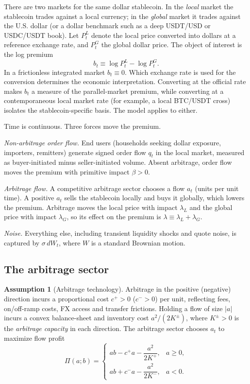 \documentclass[12pt]{article}
\theoremstyle{definition}
\newtheorem{assumption}{Assumption}
\theoremstyle{remark}
\begin{document}
There are two markets for the same dollar stablecoin. In the \emph{local} market the stablecoin trades against a local currency; in the \emph{global} market it trades against the U.S. dollar (or a dollar benchmark such as a deep USDT/USD or USDC/USDT book). Let $P^L_t$ denote the local price converted into dollars at a reference exchange rate, and $P^G_t$ the global dollar price. The object of interest is the log premium
\[
b_t \equiv \log P^L_t - \log P^G_t .
\]
In a frictionless integrated market $b_t\equiv 0$. Which exchange rate is used for the conversion determines the economic interpretation. Converting at the official rate makes $b_t$ a measure of the parallel-market premium, while converting at a contemporaneous local market rate (for example, a local BTC/USDT cross) isolates the stablecoin-specific basis. The model applies to either.

Time is continuous. Three forces move the premium.

\emph{Non-arbitrage order flow.} End users (households seeking dollar exposure, importers, remitters) generate signed order flow $q_t$ in the local market, measured as buyer-initiated minus seller-initiated volume. Absent arbitrage, order flow moves the premium with primitive impact $\beta>0$.

\emph{Arbitrage flow.} A competitive arbitrage sector chooses a flow $a_t$ (units per unit time). A positive $a_t$ sells the stablecoin locally and buys it globally, which lowers the premium. Arbitrage moves the local price with impact $\lambda_L$ and the global price with impact $\lambda_G$, so its effect on the premium is $\lambda\equiv\lambda_L+\lambda_G$.

\emph{Noise.} Everything else, including transient liquidity shocks and quote noise, is captured by $\sigma\,dW_t$, where $W$ is a standard Brownian motion.

\subsection{The arbitrage sector}

\begin{assumption}[Arbitrage technology]\label{ass:arb}
Arbitrage in the positive (negative) direction incurs a proportional cost $c^+>0$ ($c^->0$) per unit, reflecting fees, on/off-ramp costs, FX access and transfer frictions. Holding a flow of size $|a|$ incurs a convex balance-sheet and inventory cost $a^2/(2K^\pm)$, where $K^\pm>0$ is the \emph{arbitrage capacity} in each direction. The arbitrage sector chooses $a_t$ to maximize flow profit
\begin{equation}\label{eq:arbprofit}
\Pi(a;b) =
\begin{cases}
ab - c^+a - \dfrac{a^2}{2K^+}, & a\ge 0,\\[8pt]
ab + c^-a - \dfrac{a^2}{2K^-}, & a<0.
\end{cases}
\end{equation}
\end{assumption}
\end{document}

